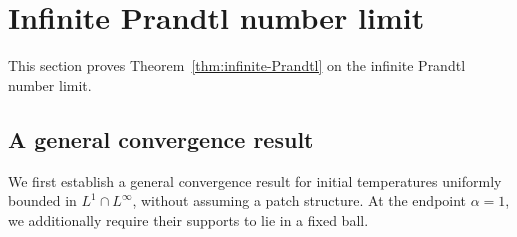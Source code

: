 \documentclass[reqno,11pt,a4paper]{amsart}
\begin{document}



\section{Infinite Prandtl number limit}\label{sec:limit}


This section proves Theorem~\ref{thm:infinite-Prandtl}
on the infinite Prandtl number limit.


\subsection{A general convergence result}


We first establish a general convergence result
for initial temperatures uniformly bounded
in $L^1\cap L^\infty$, without assuming a patch structure.
At the endpoint $\alpha=1$, we additionally require
their supports to lie in a fixed ball.
\end{document}
